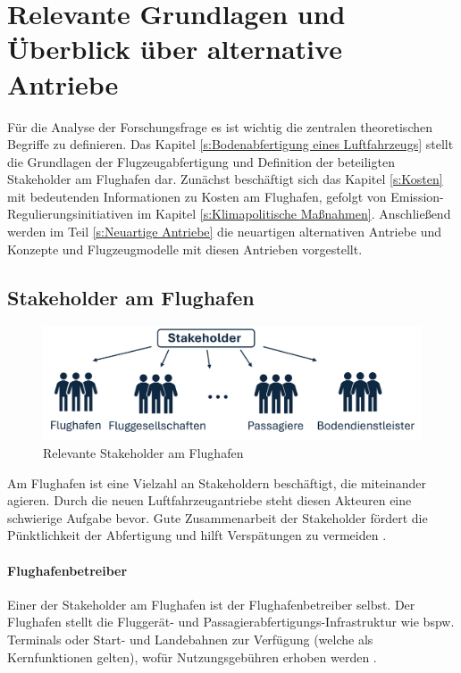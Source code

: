 \chapter{Relevante Grundlagen und Überblick über alternative Antriebe}
\label{ch:Relevante Grundlagen und Überblick über alternative Antriebe}
Für die Analyse der Forschungsfrage es ist wichtig die zentralen theoretischen Begriffe zu definieren. 
Das Kapitel \ref{s:Bodenabfertigung eines Luftfahrzeugs} stellt die Grundlagen der Flugzeugabfertigung und Definition
der beteiligten Stakeholder am Flughafen dar. Zunächst beschäftigt sich das Kapitel \ref{s:Kosten}
mit bedeutenden Informationen zu Kosten am Flughafen, gefolgt von Emission-Regulierungsinitiativen im Kapitel \ref{s:Klimapolitische Maßnahmen}. 
Anschließend werden im Teil \ref{s:Neuartige Antriebe}
die neuartigen alternativen Antriebe und Konzepte und Flugzeugmodelle mit diesen Antrieben vorgestellt.

\section{Stakeholder am Flughafen}
\label{s:Stakeholder am Flughafen}
%
\begin{figure}[h]
	\centering
	\includegraphics[width=0.8\linewidth]{Bilder/Stakeholder.png}
	\caption[Relevante Stakeholder am Flughafen]{Relevante Stakeholder am Flughafen}
	\label{stakeholder}
\end{figure}

Am Flughafen ist eine Vielzahl an Stakeholdern beschäftigt, die miteinander agieren. 
Durch die neuen Luftfahrzeugantriebe steht diesen Akteuren eine schwierige Aufgabe bevor. 
Gute Zusammenarbeit der Stakeholder fördert die Pünktlichkeit der Abfertigung und 
hilft Verspätungen zu vermeiden \cite{schmidt2016challenges}.

\subsubsection{Flughafenbetreiber}
Einer der Stakeholder am Flughafen ist der Flughafenbetreiber selbst. 
Der Flughafen stellt die Fluggerät- und Passagierabfertigungs-Infrastruktur wie bspw. 
Terminals oder Start- und Landebahnen zur Verfügung (welche als Kernfunktionen gelten), 
wofür Nutzungsgebühren erhoben werden \cite{conrady2019luftverkehr}. %

